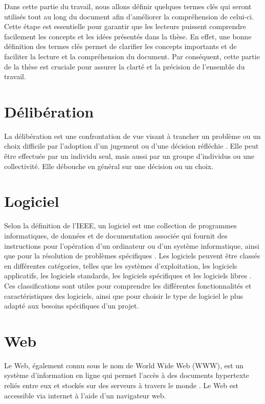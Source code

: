 Dans cette partie du travail, nous allons définir quelques termes clés qui seront
utilisés tout au long du document afin d'améliorer la compréhension de celui-ci.
Cette étape est essentielle pour garantir que les lecteurs puissent comprendre
facilement les concepts et les idées présentés dans la thèse. En effet,
une bonne définition des termes clés permet de clarifier les concepts importants
et de faciliter la lecture et la compréhension du document. Par conséquent, cette partie
de la thèse est cruciale pour assurer la clarté et la précision de l'ensemble du travail.

\section{Délibération}\label{sec:deliberation}
La délibération est une confrontation de vue
visant à trancher un problème ou un choix difficile par l'adoption d'un
jugement ou d'une décision réfléchie \cite{deliberation}\cite{deliberation2}. Elle peut être effectuée par un individu seul,
mais aussi par un groupe d'individus ou une collectivité. Elle débouche en général sur
une décision ou un choix.

\section{Logiciel}\label{sec:application}
Selon la définition de l'IEEE, un logiciel est une collection de
programmes informatiques, de données et de documentation associée qui fournit des
instructions pour l'opération d'un ordinateur ou d'un système informatique, ainsi que pour la
résolution de problèmes spécifiques \cite{IEEEglossary}. Les logiciels peuvent être classés en
différentes catégories, telles que les systèmes d'exploitation, les logiciels applicatifs, les
logiciels standards, les logiciels spécifiques et les logiciels libres \cite{logiciel}.
Ces classifications sont utiles pour comprendre les différentes fonctionnalités et caractéristiques des
logiciels, ainsi que pour choisir le type de logiciel le plus adapté aux besoins spécifiques d'un projet.

\section{Web}\label{subsec:web}
Le Web, également connu sous le nom de World Wide Web (WWW),
est un système d'information en ligne qui permet l'accès à des
documents hypertexte reliés entre eux et stockés sur des serveurs à travers le monde \cite{berners1992world}.
Le Web est accessible via internet à l'aide d'un navigateur web.

